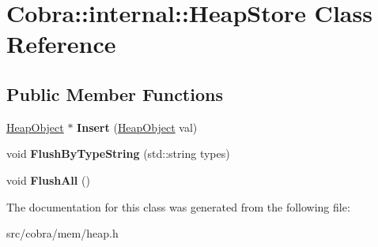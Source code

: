 \hypertarget{class_cobra_1_1internal_1_1_heap_store}{\section{Cobra\+:\+:internal\+:\+:Heap\+Store Class Reference}
\label{class_cobra_1_1internal_1_1_heap_store}
}
\subsection*{Public Member Functions}
\begin{DoxyCompactItemize}
\item 
\hypertarget{class_cobra_1_1internal_1_1_heap_store_adcf5e620d5f98a2162a70075f60190dc}{\hyperlink{struct_cobra_1_1internal_1_1_heap_object}{Heap\+Object} $\ast$ {\bfseries Insert} (\hyperlink{struct_cobra_1_1internal_1_1_heap_object}{Heap\+Object} val)}\label{class_cobra_1_1internal_1_1_heap_store_adcf5e620d5f98a2162a70075f60190dc}

\item 
\hypertarget{class_cobra_1_1internal_1_1_heap_store_a22c405bbd4db21e701296615964423ac}{void {\bfseries Flush\+By\+Type\+String} (std\+::string types)}\label{class_cobra_1_1internal_1_1_heap_store_a22c405bbd4db21e701296615964423ac}

\item 
\hypertarget{class_cobra_1_1internal_1_1_heap_store_a99373fbcab7dd825cd6255743317329c}{void {\bfseries Flush\+All} ()}\label{class_cobra_1_1internal_1_1_heap_store_a99373fbcab7dd825cd6255743317329c}

\end{DoxyCompactItemize}


The documentation for this class was generated from the following file\+:\begin{DoxyCompactItemize}
\item 
src/cobra/mem/heap.\+h\end{DoxyCompactItemize}
